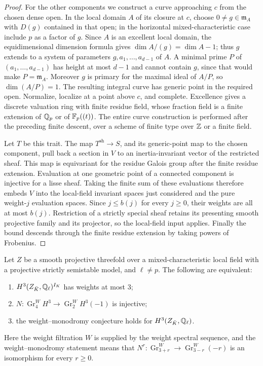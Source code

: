 \begin{proof}
For the other components we construct a curve approaching $c$ from
the chosen dense open.  In the local domain $A$ of its closure at
$c$, choose $0\ne g\in\mathfrak m_A$ with $D(g)$ contained in
that open; in the horizontal mixed-characteristic case include $p$
as a factor of $g$.  Since $A$ is an excellent local domain,
the equidimensional dimension formula gives
$\dim A/(g)=\dim A-1$; thus $g$ extends to a system of parameters
$g,a_1,\ldots,a_{d-1}$ of $A$.  A minimal prime $P$ of
$(a_1,\ldots,a_{d-1})$ has height at most $d-1$ and cannot
contain $g$, since that would make $P=\mathfrak m_A$.
Moreover $g$ is primary for the maximal ideal of $A/P$, so
$\dim(A/P)=1$.  The resulting integral curve has generic point
in the required open.  Normalize, localize at a point above $c$,
and complete.  Excellence gives a discrete valuation ring with
finite residue field, whose fraction field is a finite extension
of $\mathbb Q_p$ or of $\mathbb F_p((t))$.  The entire curve construction is
performed after the preceding finite descent, over a scheme of
finite type over $\mathbb Z$ or a finite field.

Let $T$ be this trait.  The map $T^{\mathrm{sh}}\to S$, and its
generic-point map to the chosen component, pull back a section in
$V$ to an inertia-invariant vector of the restricted sheaf.
This map is equivariant for the residue Galois group after the
finite residue extension.  Evaluation at one geometric point of
a connected component is injective for a lisse sheaf.  Taking
the finite sum of these evaluations therefore embeds $V$ into
the local-field invariant spaces just considered and the pure
weight-$j$ evaluation spaces.  Since $j\leq b(j)$ for every
$j\geq0$, their weights are all at most $b(j)$.
Restriction of a strictly special sheaf retains its presenting
smooth projective family and its projector, so the local-field
input applies.  Finally the bound descends through the finite
residue extension by taking powers of Frobenius.
\end{proof}

\begin{corollary}
\label{c:threefold-weight-gate}
Let $Z$ be a smooth projective threefold over a mixed-characteristic
local field with a projective strictly semistable model, and
$\ell\ne p$.  The following are equivalent:
\begin{enumerate}[label=(\roman*)]
\item $H^3(Z_{\bar K},\mathbb Q_\ell)^{I_K}$ has weights at most $3$;
\item $N:\operatorname{Gr}^W_4H^3\to
       \operatorname{Gr}^W_2H^3(-1)$ is injective;
\item the weight--monodromy conjecture holds for $H^3(Z_{\bar K},\mathbb Q_\ell)$.
\end{enumerate}
Here the weight filtration $W$ is supplied by the weight spectral
sequence, and the weight--monodromy statement means that
$N^r:\operatorname{Gr}^W_{3+r}\to
\operatorname{Gr}^W_{3-r}(-r)$ is an isomorphism for every $r\geq0$.
\end{corollary}

